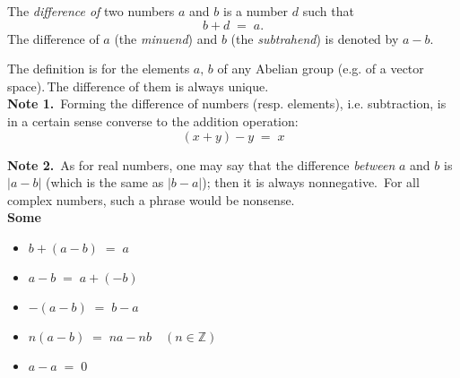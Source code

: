 \documentclass[12pt]{article}
\theoremstyle{definition}
\begin{document}
The {\em difference of} two numbers $a$ and $b$ is a number $d$ such that 
$$b\!+\!d \;=\; a.$$
The difference of $a$ (the {\em minuend}) and $b$ (the {\em subtrahend}) is denoted by $a\!-\!b$.

The definition is  for the elements $a,\,b$ of any  Abelian group (e.g. of a vector space).\,The difference of them is always unique.\\

\textbf{Note 1.}\, Forming the difference of numbers (resp. elements), i.e. subtraction, is in a certain sense converse to the addition operation:
$$(x\!+\!y)\!-\!y \;=\; x$$

\textbf{Note 2.}\, As for real numbers, one may say that the difference \emph{between} $a$ and $b$ is $|a\!-\!b|$ (which is the same as $|b\!-\!a|$); then it is always nonnegative.\, For all complex numbers, such a phrase would be nonsense.\\


\textbf{Some }
\begin{itemize}
\item $b\!+\!(a\!-\!b) \;=\; a$
\item $a\!-\!b \;=\; a\!+\!(-b)$
\item $-(a\!-\!b) \;=\; b\!-\!a$
\item $n(a\!-\!b) \;=\; na\!-\!nb \quad (n\in\mathbb{Z})$
\item $a\!-\!a \;=\; 0$
\end{itemize}




\end{document}
